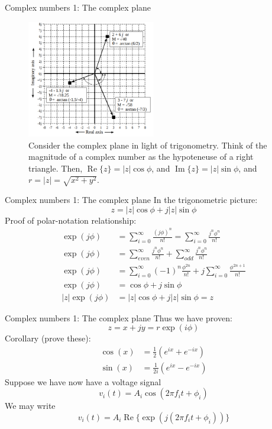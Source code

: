 \documentclass{beamer}
\begin{document}
\begin{frame}{Complex numbers 1: The complex plane}
\begin{figure}
\centering
\includegraphics[width=0.5\textwidth]{figures/plane2.png}
\caption{\label{fig:complex5} Consider the complex plane in light of trigonometry.  Think of the magnitude of a complex number as the hypoteneuse of a right triangle.  Then, $\operatorname{Re}\lbrace z \rbrace = |z|\cos\phi$, and $\operatorname{Im}\lbrace z \rbrace = |z|\sin\phi$, and $r = |z| = \sqrt{x^2+y^2}$.}
\end{figure}
\end{frame}

\begin{frame}{Complex numbers 1: The complex plane}
\small
In the trigonometric picture:
\begin{equation}
z = |z| \cos\phi + j |z| \sin\phi
\end{equation}
Proof of polar-notation relationship:
\begin{align}
\exp(j\phi) &= \sum_{i=0}^{\infty} \frac{(j\phi)^n}{n!} = \sum_{i=0}^{\infty} \frac{j^n\phi^n}{n!} \\
\exp(j\phi) &= \sum_{even}^{\infty} \frac{j^n\phi^n}{n!} + \sum_{odd}^{\infty} \frac{j^n\phi^n}{n!} \\
\exp(j\phi) &= \sum_{i=0}^{\infty} (-1)^n \frac{\phi^{2n}}{n!} + j\sum_{i=0}^{\infty} \frac{\phi^{2n+1}}{n!} \\
\exp(j\phi) &= \cos\phi + j\sin\phi \\
|z|\exp(j\phi) &= |z| \cos\phi + j |z| \sin\phi = z
\end{align}
\end{frame}

\begin{frame}{Complex numbers 1: The complex plane}
Thus we have proven:
\begin{equation}
\boxed{ z = x+jy = r \exp(i\phi)
}
\end{equation}
Corollary (prove these):
\begin{align}
\cos(x) &= \frac{1}{2}\left(e^{ix} + e^{-ix}\right) \\
\sin(x) &= \frac{1}{2i}\left(e^{ix} - e^{-ix}\right)
\end{align}
Suppose we have now have a voltage signal
\begin{equation}
v_i(t) = A_i \cos(2\pi f_i t + \phi_i)
\end{equation}
We may write
\begin{equation}
v_i(t) = A_i \operatorname{Re}\lbrace \exp(j(2\pi f_i t + \phi_i)) \rbrace
\end{equation}
\end{frame}
\end{document}
